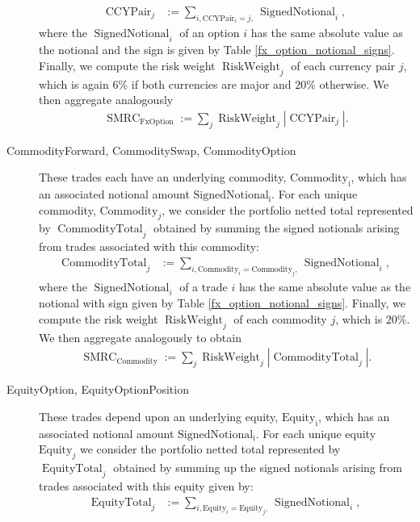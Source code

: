 \begin{description}
	\begin{align*}
		\operatorname{CCYPair}_{j} & := \sum_{i,\text{CCYPair}_i=j,}{\operatorname{SignedNotional}_i},
	\end{align*}
	where the $\operatorname{SignedNotional}_i$ of an option $i$ has the same absolute value as the notional and the sign is given by Table \ref{fx_option_notional_signs}.
	Finally, we compute the risk weight $\operatorname{RiskWeight}_j$ of each currency pair $j$, which is again $6\%$ if both currencies are major and $20\%$ otherwise. We then aggregate analogously
	\begin{align*}
		\operatorname{SMRC}_{\text{FxOption}} := \sum_{j}{\operatorname{RiskWeight}_j |\operatorname{CCYPair}_{j}| }.
	\end{align*}
	\item[CommodityForward, CommoditySwap, CommodityOption] These trades each have an underlying commodity, $\operatorname{Commodity_i}$, which has an associated notional amount $\operatorname{SignedNotional_i}$. For each unique commodity, $\text{Commodity}_j$, we consider the portfolio netted total represented by $\operatorname{CommodityTotal}_j$ obtained by summing the signed notionals arising from trades associated with this commodity:
	\begin{align*}
		\operatorname{CommodityTotal}_{j} & := \sum_{i,\text{Commodity}_i=\text{Commodity}_j,}{\operatorname{SignedNotional}_i},
	\end{align*}
	where the $\operatorname{SignedNotional}_i$ of a trade $i$ has the same absolute value as the notional with sign given by Table \ref{fx_option_notional_signs}.
	Finally, we compute the risk weight $\operatorname{RiskWeight}_j$ of each commodity $j$, which is $20\%$. We then aggregate analogously to obtain
	\begin{align*}
		\operatorname{SMRC}_{\text{Commodity}} := \sum_{j}{\operatorname{RiskWeight}_j |\operatorname{CommodityTotal}_{j}| }.
	\end{align*}
	\item[EquityOption, EquityOptionPosition] These trades depend upon an underlying equity, $\operatorname{Equity_i}$, which has an associated notional amount $\operatorname{SignedNotional_i}$. For each unique equity $\text{Equity}_j$ we consider the portfolio netted total represented by $\operatorname{EquityTotal}_j$ obtained by summing up the signed notionals arising from trades associated with this equity given by:
	\begin{align*}
		\operatorname{EquityTotal}_{j} & := \sum_{i,\text{Equity}_i=\text{Equity}_j,}{\operatorname{SignedNotional}_i},

\end{align*}
\end{description}
